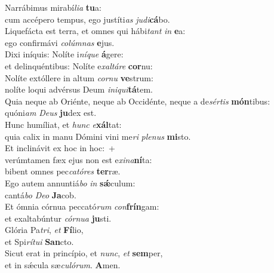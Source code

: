 \evenverse Narrábimus mirabí\textit{li}\textit{a} \textbf{tu}a:~\*\\
\evenverse cum accépero tempus, ego justíti\textit{as} \textit{ju}\textit{di}\textbf{cá}bo.\\
\oddverse Liquefácta est terra, et omnes qui hábi\textit{tant} \textit{in} \textbf{e}a:~\*\\
\oddverse ego confirmávi \textit{co}\textit{lúm}\textit{nas} \textbf{e}jus.\\
\evenverse Dixi iníquis: Nolíte i\textit{ní}\textit{que} \textbf{á}gere:~\*\\
\evenverse et delinquéntibus: Nolíte e\textit{xal}\textit{tá}\textit{re} \textbf{cor}nu:\\
\oddverse Nolíte extóllere in altum \textit{cor}\textit{nu} \textbf{ve}strum:~\*\\
\oddverse nolíte loqui advérsus Deum \textit{i}\textit{ni}\textit{qui}\textbf{tá}tem.\\
\evenverse Quia neque ab Oriénte, neque ab Occidénte, neque a de\textit{sér}\textit{tis} \textbf{món}tibus:~\*\\
\evenverse quóni\textit{am} \textit{De}\textit{us} \textbf{ju}dex est.\\
\oddverse Hunc humíliat, et \textit{hunc} \textit{e}\textbf{xál}tat:~\*\\
\oddverse quia calix in manu Dómini vini me\textit{ri} \textit{ple}\textit{nus} \textbf{mi}sto.\\
\evenverse Et inclinávit ex hoc in hoc:~+\\
\evenverse  verúmtamen fæx ejus non est e\textit{xi}\textit{na}\textbf{ní}ta:~\*\\
\evenverse bibent omnes pec\textit{ca}\textit{tó}\textit{res} \textbf{ter}ræ.\\
\oddverse Ego autem annuntiá\textit{bo} \textit{in} \textbf{sǽ}culum:~\*\\
\oddverse cantá\textit{bo} \textit{De}\textit{o} \textbf{Ja}cob.\\
\evenverse Et ómnia córnua peccató\textit{rum} \textit{con}\textbf{frín}gam:~\*\\
\evenverse et exaltabúntur \textit{cór}\textit{nu}\textit{a} \textbf{ju}sti.\\
\oddverse Glória Pa\textit{tri}, \textit{et} \textbf{Fí}lio,~\*\\
\oddverse et Spi\textit{rí}\textit{tu}\textit{i} \textbf{San}cto.\\
\evenverse Sicut erat in princípio, et \textit{nunc}, \textit{et} \textbf{sem}per,~\*\\
\evenverse et in sǽcula sæ\textit{cu}\textit{ló}\textit{rum}. \textbf{A}men.\\

